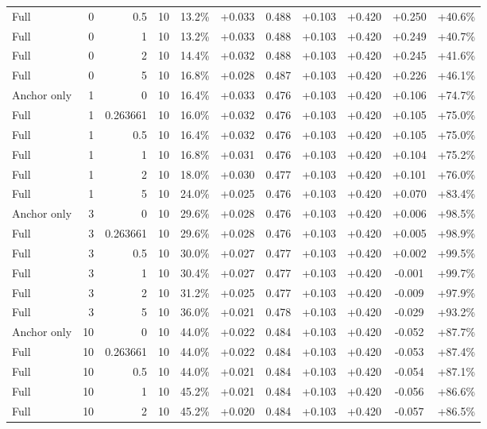 \begin{table}[htbp]
\begin{tabular}{lrrrccccccc}
Full & 0 & 0.5 & 10 & 13.2\% & +0.033 & 0.488 & +0.103 & +0.420 & +0.250 & +40.6\% \\
Full & 0 & 1 & 10 & 13.2\% & +0.033 & 0.488 & +0.103 & +0.420 & +0.249 & +40.7\% \\
Full & 0 & 2 & 10 & 14.4\% & +0.032 & 0.488 & +0.103 & +0.420 & +0.245 & +41.6\% \\
Full & 0 & 5 & 10 & 16.8\% & +0.028 & 0.487 & +0.103 & +0.420 & +0.226 & +46.1\% \\
Anchor only & 1 & 0 & 10 & 16.4\% & +0.033 & 0.476 & +0.103 & +0.420 & +0.106 & +74.7\% \\
Full & 1 & 0.263661 & 10 & 16.0\% & +0.032 & 0.476 & +0.103 & +0.420 & +0.105 & +75.0\% \\
Full & 1 & 0.5 & 10 & 16.4\% & +0.032 & 0.476 & +0.103 & +0.420 & +0.105 & +75.0\% \\
Full & 1 & 1 & 10 & 16.8\% & +0.031 & 0.476 & +0.103 & +0.420 & +0.104 & +75.2\% \\
Full & 1 & 2 & 10 & 18.0\% & +0.030 & 0.477 & +0.103 & +0.420 & +0.101 & +76.0\% \\
Full & 1 & 5 & 10 & 24.0\% & +0.025 & 0.476 & +0.103 & +0.420 & +0.070 & +83.4\% \\
Anchor only & 3 & 0 & 10 & 29.6\% & +0.028 & 0.476 & +0.103 & +0.420 & +0.006 & +98.5\% \\
Full & 3 & 0.263661 & 10 & 29.6\% & +0.028 & 0.476 & +0.103 & +0.420 & +0.005 & +98.9\% \\
Full & 3 & 0.5 & 10 & 30.0\% & +0.027 & 0.477 & +0.103 & +0.420 & +0.002 & +99.5\% \\
Full & 3 & 1 & 10 & 30.4\% & +0.027 & 0.477 & +0.103 & +0.420 & -0.001 & +99.7\% \\
Full & 3 & 2 & 10 & 31.2\% & +0.025 & 0.477 & +0.103 & +0.420 & -0.009 & +97.9\% \\
Full & 3 & 5 & 10 & 36.0\% & +0.021 & 0.478 & +0.103 & +0.420 & -0.029 & +93.2\% \\
Anchor only & 10 & 0 & 10 & 44.0\% & +0.022 & 0.484 & +0.103 & +0.420 & -0.052 & +87.7\% \\
Full & 10 & 0.263661 & 10 & 44.0\% & +0.022 & 0.484 & +0.103 & +0.420 & -0.053 & +87.4\% \\
Full & 10 & 0.5 & 10 & 44.0\% & +0.021 & 0.484 & +0.103 & +0.420 & -0.054 & +87.1\% \\
Full & 10 & 1 & 10 & 45.2\% & +0.021 & 0.484 & +0.103 & +0.420 & -0.056 & +86.6\% \\
Full & 10 & 2 & 10 & 45.2\% & +0.020 & 0.484 & +0.103 & +0.420 & -0.057 & +86.5\% \\

\end{tabular}
\end{table}
